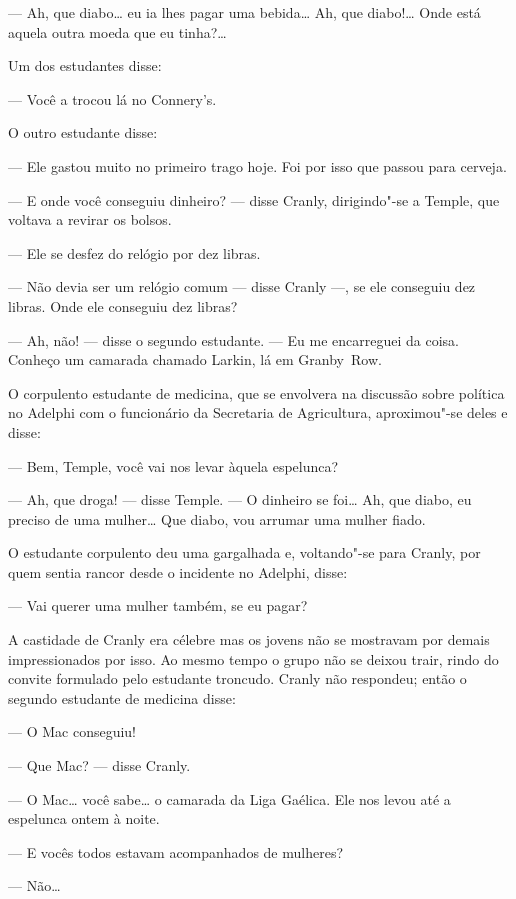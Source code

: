 --- Ah, que diabo\ldots{} eu ia lhes pagar uma bebida\ldots{}  Ah, que
diabo!\ldots{}  Onde está aquela outra moeda que eu tinha?\ldots{}

Um dos estudantes disse:

--- Você a trocou lá no Connery’s.

O outro estudante disse:

--- Ele gastou muito no primeiro trago hoje.  Foi por isso que
passou para cerveja.

--- E onde você conseguiu dinheiro? --- disse Cranly, dirigindo"-se
a Temple, que voltava a revirar os bolsos.

--- Ele se desfez do relógio por dez libras.

--- Não devia ser um relógio comum --- disse Cranly ---, se ele
conseguiu dez libras.  Onde ele conseguiu dez libras?

--- Ah, não! --- disse o segundo estudante.  --- Eu me encarreguei da
coisa.  Conheço um camarada chamado Larkin, lá em Granby~Row.

O corpulento estudante de medicina, que se envolvera na discussão
sobre política no Adelphi com o funcionário da Secretaria de		
Agricultura, aproximou"-se deles e disse:

--- Bem, Temple, você vai nos levar àquela espelunca?

--- Ah, que droga! --- disse Temple.  --- O dinheiro se foi\ldots{}  Ah,
que diabo, eu preciso de uma mulher\ldots{}  Que diabo, vou arrumar uma
mulher fiado.

O estudante corpulento deu uma gargalhada e, voltando"-se para
Cranly, por quem sentia rancor desde o incidente no Adelphi, disse:		

--- Vai querer uma mulher também, se eu pagar?

A castidade de Cranly era célebre mas os jovens não se mostravam por
demais impressionados por isso.  Ao mesmo tempo o grupo não
se deixou trair, rindo do convite formulado pelo estudante troncudo. 
Cranly não respondeu; então o segundo estudante de medicina disse:

--- O Mac conseguiu!

--- Que Mac? --- disse Cranly.

--- O Mac\ldots{} você sabe\ldots{} o camarada da Liga Gaélica.  Ele nos
levou até a espelunca ontem à noite.

--- E vocês todos estavam acompanhados de mulheres?

--- Não\ldots{}

